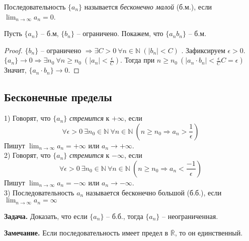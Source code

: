 
    \begin{definition}
        Последовательность $\{a_{n}\}$ называется \textit{бесконечно малой} (б.м.), если $\lim_{n \to \infty} a_{n} = 0$.
    \end{definition}
    
    \begin{example}
        Пусть $\{a_{n}\}$ -- б.м, $\{b_{n}\}$ -- ограничено. Покажем, что $\{a_{n} b_{n}\}$ -- б.м. 
    \end{example}
    
    \begin{proof}
        $\{b_{n}\}$ -- ограничено $\Rightarrow \exists C > 0 \ \forall n \in \mathds{N} \ (|b_{n}| < C)$ . Зафиксируем $\epsilon > 0$. $\{a_{n}\} \rightarrow 0 \Rightarrow \exists n_{0} \ \forall n \geq n_{0} \ (|a_{n}| < \frac{\epsilon}{C})$. Тогда при $n \geq n_{0} \ (|a_{n} \cdot b_{n}| < \frac{\epsilon}{C}C = \epsilon)$
        \\
        Значит, $\{a_{n} \cdot b_{n}\} \rightarrow 0$.
    \end{proof}
    
\subsection{Бесконечные пределы}
    
    \begin{definition}
        1) Говорят, что $\{a_{n}\}$ \textit{стремится} к $+ \infty$, если 
        \[\forall \epsilon > 0 \  \exists n_{0} \in \mathds{N} \ \forall n \in \mathds{N} \ (n \geq n_{0} \Rightarrow a_{n} > \frac{1}{\epsilon})\]
        Пишут $\lim_{n \to \infty} a_{n} = + \infty$ или $ a_{n} \rightarrow + \infty$.
        \\
        2) Говорят, что $\{a_{n}\}$ \textit{стремится} к $- \infty$, если 
        \[\forall \epsilon > 0 \  \exists n_{0} \in \mathds{N} \ \forall n \in \mathds{N} \ (n \geq n_{0} \Rightarrow a_{n} < \frac{-1}{\epsilon})\]
        Пишут $\lim_{n \to \infty} a_{n} = - \infty$ или $ a_{n} \rightarrow - \infty$.
        \\
        3) Последовательность $a_{n}$ называется бесконечно большой (б.б.), если $\lim_{n \to \infty} a_{n} = \infty$
    \end{definition}
    
    \textbf{Задача.} Доказать, что если $\{a_{n}\}$ -- б.б., тогда $\{a_{n}\}$ -- неограниченная.
    
    \textbf{Замечание.} Если последовательность имеет предел в $\overline{\mathds{R}}$, то он единственный.
    
